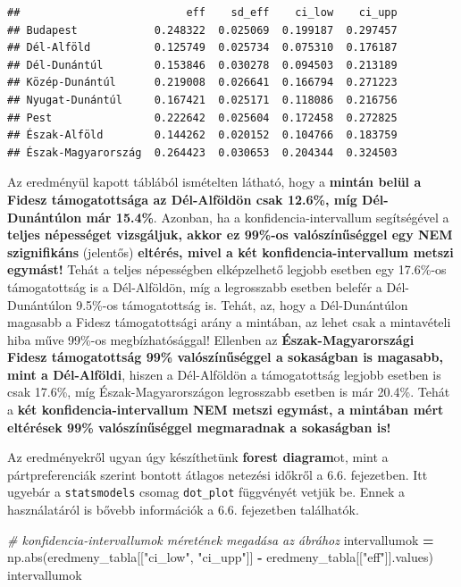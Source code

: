 \documentclass[
]{book}
\newenvironment{Shaded}{\begin{snugshade}}{\end{snugshade}}
\newcommand{\BuiltInTok}[1]{#1}
\newcommand{\CommentTok}[1]{\textcolor[rgb]{0.56,0.35,0.01}{\textit{#1}}}
\newcommand{\NormalTok}[1]{#1}
\newcommand{\OperatorTok}[1]{\textcolor[rgb]{0.81,0.36,0.00}{\textbf{#1}}}
\newcommand{\StringTok}[1]{\textcolor[rgb]{0.31,0.60,0.02}{#1}}
\begin{document}
\begin{verbatim}
##                          eff    sd_eff    ci_low    ci_upp
## Budapest            0.248322  0.025069  0.199187  0.297457
## Dél-Alföld          0.125749  0.025734  0.075310  0.176187
## Dél-Dunántúl        0.153846  0.030278  0.094503  0.213189
## Közép-Dunántúl      0.219008  0.026641  0.166794  0.271223
## Nyugat-Dunántúl     0.167421  0.025171  0.118086  0.216756
## Pest                0.222642  0.025604  0.172458  0.272825
## Észak-Alföld        0.144262  0.020152  0.104766  0.183759
## Észak-Magyarország  0.264423  0.030653  0.204344  0.324503
\end{verbatim}

Az eredményül kapott táblából ismételten látható, hogy a \textbf{mintán belül a Fidesz támogatottsága az Dél-Alföldön csak 12.6\%, míg Dél-Dunántúlon már 15.4\%}. Azonban, ha a konfidencia-intervallum segítségével a \textbf{teljes népességet vizsgáljuk, akkor ez 99\%-os valószínűséggel egy NEM szignifikáns} (jelentős) \textbf{eltérés, mivel a két konfidencia-intervallum metszi egymást!} Tehát a teljes népességben elképzelhető legjobb esetben egy 17.6\%-os támogatottság is a Dél-Alföldön, míg a legrosszabb esetben belefér a Dél-Dunántúlon 9.5\%-os támogatottság is. Tehát, az, hogy a Dél-Dunántúlon magasabb a Fidesz támogatottsági arány a mintában, az lehet csak a mintavételi hiba műve 99\%-os megbízhatósággal! Ellenben az \textbf{Észak-Magyarországi Fidesz támogatottság 99\% valószínűséggel a sokaságban is magasabb, mint a Dél-Alföldi}, hiszen a Dél-Alföldön a támogatottság legjobb esetben is csak 17.6\%, míg Észak-Magyarországon legrosszabb esetben is már 20.4\%. Tehát a \textbf{két konfidencia-intervallum NEM metszi egymást, a mintában mért eltérések 99\% valószínűséggel megmaradnak a sokaságban is!}

Az eredményekről ugyan úgy készíthetünk \textbf{forest diagram}ot, mint a pártpreferenciák szerint bontott átlagos netezési időkről a 6.6. fejezetben. Itt ugyebár a \texttt{statsmodels} csomag \texttt{dot\_plot} függvényét vetjük be. Ennek a használatáról is bővebb információk a 6.6. fejezetben találhatók.

\begin{Shaded}
\begin{Highlighting}[]
\CommentTok{\# konfidencia{-}intervallumok méretének megadása az ábrához}
\NormalTok{intervallumok }\OperatorTok{=}\NormalTok{ np.}\BuiltInTok{abs}\NormalTok{(eredmeny\_tabla[[}\StringTok{"ci\_low"}\NormalTok{, }\StringTok{"ci\_upp"}\NormalTok{]] }\OperatorTok{{-}}\NormalTok{ eredmeny\_tabla[[}\StringTok{"eff"}\NormalTok{]].values)}
\NormalTok{intervallumok}
\end{Highlighting}
\end{Shaded}
\end{document}
